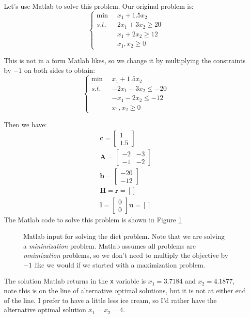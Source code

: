 \begin{example}
Let's use Matlab to solve this problem. Our original problem is:
\begin{displaymath}
\left\{
\begin{aligned}
\min\;\;& x_1 + 1.5x_2\\
s.t. \;\;& 2x_1 + 3x_2 \geq 20\\
& x_1 + 2x_2 \geq 12\\
&x_1, x_2 \geq 0
\end{aligned}\right.
\end{displaymath}

This is not in a form Matlab likes, so we change it by multiplying the constraints by $-1$ on both sides to obtain:
\begin{displaymath}
\left\{
\begin{aligned}
\min\;\;& x_1 + 1.5x_2\\
s.t. \;\;& -2x_1 - 3x_2 \leq -20\\
& -x_1 - 2x_2 \leq -12\\
&x_1, x_2 \geq 0
\end{aligned}\right.
\end{displaymath}

Then we have:
\begin{gather*}
\mathbf{c} = \begin{bmatrix}1\\1.5\end{bmatrix}\\
\mathbf{A} = \begin{bmatrix}-2 & -3\\-1 & -2\end{bmatrix}\\
\mathbf{b} = \begin{bmatrix}-20\\-12\end{bmatrix}\\
\mathbf{H} = \mathbf{r} = []\\
\mathbf{l} = \begin{bmatrix}0\\0\end{bmatrix}
\mathbf{u} = []
\end{gather*}
The Matlab code to solve this problem is shown in Figure \ref{fig:MatlabDiet}
\begin{figure}[htbp]
\centering
\scriptsize

\normalsize
\caption{Matlab input for solving the diet problem. Note that we are solving a \textit{minimization} problem. Matlab assumes all problems are \textit{mnimization} problems, so we don't need to multiply the objective by $-1$ like we would if we started with a maximization problem.}
\label{fig:MatlabDiet}
\end{figure}
The solution Matlab returns in the \texttt{x} variable is $x_1 = 3.7184$ and $x_2 = 4.1877$, note this is on the line of alternative optimal solutions, but it is not at either end of the line. I prefer to have a little less ice cream, so I'd rather have the alternative optimal solution $x_1 = x_2 = 4$.
\label{ex:Diet}
\end{example}

